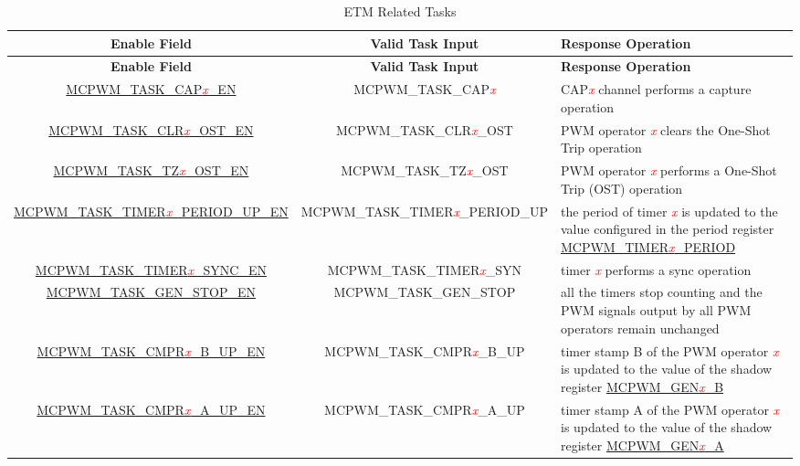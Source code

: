 \begin{longtable}{ | c | c | C{5cm} |}
    \caption{ETM Related Tasks}
    \label{tab:mcpwm-etm-task}
    \\\hline
   \textbf{Enable Field} & \textbf{Valid Task Input} & \textbf{Response Operation} \\\hline
    \endfirsthead
    \hline
    \textbf{Enable Field} & \textbf{Valid Task Input} & \textbf{Response Operation} \\\hline
    \endhead
    \hline
    \endfoot
    
    \hyperref[fielddesc:MCPWMTASKCAP0EN]{MCPWM\_TASK\_CAP\textcolor{red}{\it{x}}\_EN}
    &  MCPWM\_TASK\_CAP\textcolor{red}{\it{x}}
    &  CAP\textcolor{red}{\it{x}} channel performs a capture operation \\\hline
    \hyperref[fielddesc:MCPWMTASKCLR0OSTEN]{MCPWM\_TASK\_CLR\textcolor{red}{\it{x}}\_OST\_EN}
    &  MCPWM\_TASK\_CLR\textcolor{red}{\it{x}}\_OST
    &  PWM operator \textcolor{red}{\it{x}} clears the One-Shot Trip operation \\\hline
    \hyperref[fielddesc:MCPWMTASKTZ0OSTEN]{MCPWM\_TASK\_TZ\textcolor{red}{\it{x}}\_OST\_EN}
    &  MCPWM\_TASK\_TZ\textcolor{red}{\it{x}}\_OST
    &  PWM operator \textcolor{red}{\it{x}} performs a One-Shot Trip (OST) operation \\\hline
    \hyperref[fielddesc:MCPWMTASKTIMER0PERIODUPEN]{MCPWM\_TASK\_TIMER\textcolor{red}{\it{x}}\_PERIOD\_UP\_EN}
    &  MCPWM\_TASK\_TIMER\textcolor{red}{\it{x}}\_PERIOD\_UP
    &  the period of timer \textcolor{red}{\it{x}} is updated to the value configured in the period register \hyperref[fielddesc:MCPWMTIMER0PERIOD]{MCPWM\_TIMER\textcolor{red}{\it{x}}\_PERIOD} \\\hline
    \hyperref[fielddesc:MCPWMTASKTIMER0SYNCEN]{MCPWM\_TASK\_TIMER\textcolor{red}{\it{x}}\_SYNC\_EN}
    &  MCPWM\_TASK\_TIMER\textcolor{red}{\it{x}}\_SYN
    &  timer \textcolor{red}{\it{x}} performs a sync operation \\\hline
    \hyperref[fielddesc:MCPWMTASKGENSTOPEN]{MCPWM\_TASK\_GEN\_STOP\_EN}
    &  MCPWM\_TASK\_GEN\_STOP
    &  all the timers stop counting and the PWM signals output by all PWM operators remain unchanged \\\hline
    \hyperref[fielddesc:MCPWMTASKCMPR0BUPEN]{MCPWM\_TASK\_CMPR\textcolor{red}{\it{x}}\_B\_UP\_EN}
    &  MCPWM\_TASK\_CMPR\textcolor{red}{\it{x}}\_B\_UP
    &  timer stamp B of the PWM operator \textcolor{red}{\it{x}} is updated to the value of the shadow register \hyperref[regdesc:MCPWMGEN0BREG]{MCPWM\_GEN\textcolor{red}{\it{x}}\_B} \\\hline
    \hyperref[fielddesc:MCPWMTASKCMPR0AUPEN]{MCPWM\_TASK\_CMPR\textcolor{red}{\it{x}}\_A\_UP\_EN}
    &  MCPWM\_TASK\_CMPR\textcolor{red}{\it{x}}\_A\_UP
    &  timer stamp A of the PWM operator \textcolor{red}{\it{x}} is updated to the value of the shadow register \hyperref[regdesc:MCPWMGEN0AREG]{MCPWM\_GEN\textcolor{red}{\it{x}}\_A} \\\hline
\end{longtable}